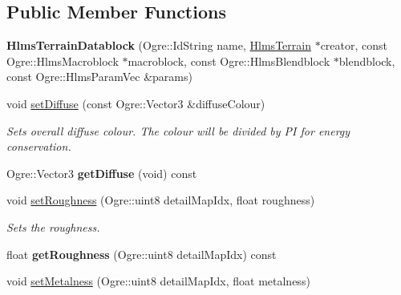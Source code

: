 \subsection*{Public Member Functions}
\begin{DoxyCompactItemize}
\item 
\mbox{\label{class_hlms_terrain_datablock_af887d30cb63012d835e4a5846067a702}} 
{\bfseries Hlms\+Terrain\+Datablock} (Ogre\+::\+Id\+String name, \hyperlink{class_hlms_terrain}{Hlms\+Terrain} $\ast$creator, const Ogre\+::\+Hlms\+Macroblock $\ast$macroblock, const Ogre\+::\+Hlms\+Blendblock $\ast$blendblock, const Ogre\+::\+Hlms\+Param\+Vec \&params)
\item 
\mbox{\label{class_hlms_terrain_datablock_a14ffcf7316b6287560c161cee9d2fb4b}} 
void \hyperlink{class_hlms_terrain_datablock_a14ffcf7316b6287560c161cee9d2fb4b}{set\+Diffuse} (const Ogre\+::\+Vector3 \&diffuse\+Colour)
\begin{DoxyCompactList}\small\item\em Sets overall diffuse colour. The colour will be divided by PI for energy conservation. \end{DoxyCompactList}\item 
\mbox{\label{class_hlms_terrain_datablock_a97d41acdfe752e5e1fc00f55b78297b3}} 
Ogre\+::\+Vector3 {\bfseries get\+Diffuse} (void) const
\item 
\mbox{\label{class_hlms_terrain_datablock_a58f763da3ef7027911a76cee7e395095}} 
void \hyperlink{class_hlms_terrain_datablock_a58f763da3ef7027911a76cee7e395095}{set\+Roughness} (Ogre\+::uint8 detail\+Map\+Idx, float roughness)
\begin{DoxyCompactList}\small\item\em Sets the roughness. \end{DoxyCompactList}\item 
\mbox{\label{class_hlms_terrain_datablock_a8db6d139f4f20d16a99d6cff8d5091d8}} 
float {\bfseries get\+Roughness} (Ogre\+::uint8 detail\+Map\+Idx) const
\item 
void \hyperlink{class_hlms_terrain_datablock_acd5e39eb1968ddda8f05d5537fe3f945}{set\+Metalness} (Ogre\+::uint8 detail\+Map\+Idx, float metalness)

\end{DoxyCompactItemize}
